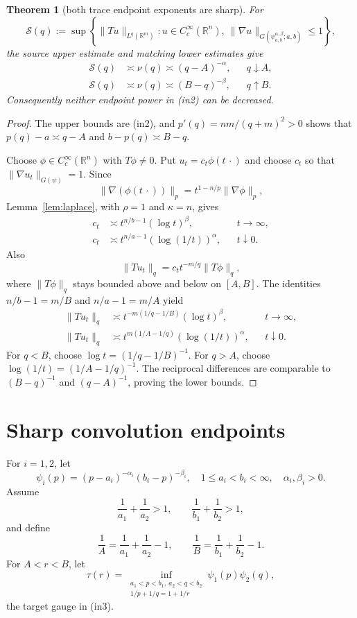 \documentclass[11pt]{article}
\newtheorem{theorem}{Theorem}
\newcommand{\R}{\mathbb R}
\newcommand{\norm}[1]{\lVert#1\rVert}
\begin{document}
\begin{theorem}[both trace endpoint exponents are sharp]\label{thm:trace}
For
\[
 \mathcal S(q):=\sup\left\{\norm{Tu}_{L^q(\R^m)}:
 u\in C_c^\infty(\R^n),\
 \norm{\nabla u}_{G(\psi_{a,b}^{\alpha,\beta};a,b)}\le1\right\},
\]
the source upper estimate and matching lower estimates give
\begin{align*}
 \mathcal S(q)&\asymp \nu(q)\asymp(q-A)^{-\alpha},
 &&q\downarrow A,\\
 \mathcal S(q)&\asymp \nu(q)\asymp(B-q)^{-\beta},
 &&q\uparrow B.
\end{align*}
Consequently neither endpoint power in (in2) can be decreased.
\end{theorem}

\begin{proof}
The upper bounds are (in2), and $p'(q)=nm/(q+m)^2>0$ shows that
$p(q)-a\asymp q-A$ and $b-p(q)\asymp B-q$.

Choose $\phi\in C_c^\infty(\R^n)$ with $T\phi\ne0$. Put
$u_t=c_t\phi(t\,\cdot)$ and choose $c_t$ so that
$\norm{\nabla u_t}_{G(\psi)}=1$. Since
\[
 \norm{\nabla(\phi(t\,\cdot))}_p
 =t^{1-n/p}\norm{\nabla\phi}_p,
\]
Lemma~\ref{lem:laplace}, with $\rho=1$ and $\kappa=n$, gives
\begin{align*}
 c_t&\asymp t^{n/b-1}(\log t)^\beta,&&t\to\infty,\\
 c_t&\asymp t^{n/a-1}(\log(1/t))^\alpha,&&t\downarrow0.
\end{align*}
Also
\[
 \norm{Tu_t}_q=c_t t^{-m/q}\norm{T\phi}_q,
\]
where $\norm{T\phi}_q$ stays bounded above and below on $[A,B]$.
The identities $n/b-1=m/B$ and $n/a-1=m/A$ yield
\begin{align*}
 \norm{Tu_t}_q&\asymp
 t^{-m(1/q-1/B)}(\log t)^\beta,&&t\to\infty,\\
 \norm{Tu_t}_q&\asymp
 t^{m(1/A-1/q)}(\log(1/t))^\alpha,&&t\downarrow0.
\end{align*}
For $q<B$, choose $\log t=(1/q-1/B)^{-1}$. For $q>A$, choose
$\log(1/t)=(1/A-1/q)^{-1}$. The reciprocal differences are comparable
to $(B-q)^{-1}$ and $(q-A)^{-1}$, proving the lower bounds.
\end{proof}

\section{Sharp convolution endpoints}
For $i=1,2$, let
\[
 \psi_i(p)=(p-a_i)^{-\alpha_i}(b_i-p)^{-\beta_i},
 \quad 1\le a_i<b_i<\infty,\quad \alpha_i,\beta_i>0.
\]
Assume
\[
 \frac1{a_1}+\frac1{a_2}>1,\qquad
 \frac1{b_1}+\frac1{b_2}>1,
\]
and define
\[
 \frac1A=\frac1{a_1}+\frac1{a_2}-1,\qquad
 \frac1B=\frac1{b_1}+\frac1{b_2}-1.
 \tag{4}
\]
For $A<r<B$, let
\[
 \tau(r)=\inf_{\substack{a_1<p<b_1,\ a_2<q<b_2\\
                    1/p+1/q=1+1/r}}
 \psi_1(p)\psi_2(q),
 \tag{5}
\]
the target gauge in (in3).
\end{document}
